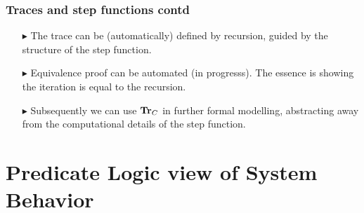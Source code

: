 \documentclass{beamer}
\newcommand{\konst}[1]{\ensuremath{\mbox{\bf{#1}}}}
\begin{document}
\begin{frame}\frametitle{Traces and step functions contd}

\begin{itemize}

\item [$\blacktriangleright$] The trace can be (automatically) defined
  by recursion, guided by the structure of the step function.

\item [$\blacktriangleright$] Equivalence proof can be automated (in progresss). The essence
  is showing the iteration is equal to the recursion.

\item [$\blacktriangleright$] Subsequently we can use $\konst{Tr}_{C}$ in
  further formal modelling, abstracting away from the computational
  details of the step function.

\end{itemize}

\end{frame}

\section {Predicate Logic view of System Behavior}
\end{document}
